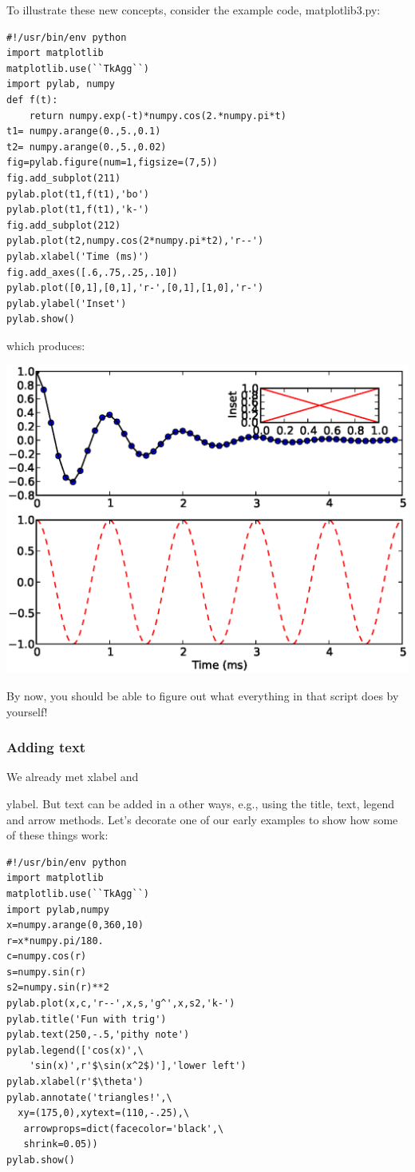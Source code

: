 \documentclass[11pt]{book}
\begin{document}
{{{To illustrate these new concepts, consider the example code, {\color{blue}matplotlib3.py}:

{ \color{blue} \begin{verbatim}
#!/usr/bin/env python
import matplotlib
matplotlib.use(``TkAgg``)
import pylab, numpy
def f(t):
    return numpy.exp(-t)*numpy.cos(2.*numpy.pi*t)
t1= numpy.arange(0.,5.,0.1)
t2= numpy.arange(0.,5.,0.02)
fig=pylab.figure(num=1,figsize=(7,5))
fig.add_subplot(211)
pylab.plot(t1,f(t1),'bo')
pylab.plot(t1,f(t1),'k-')
fig.add_subplot(212)
pylab.plot(t2,numpy.cos(2*numpy.pi*t2),'r--')
pylab.xlabel('Time (ms)')
fig.add_axes([.6,.75,.25,.10])
pylab.plot([0,1],[0,1],'r-',[0,1],[1,0],'r-')
pylab.ylabel('Inset')
pylab.show()
\end{verbatim}}

\noindent which produces:

{\includegraphics[width=15cm]{EPSfiles/matplotlib3.eps}}

\noindent By now, you should be able to figure out what everything in that script does by yourself!

\subsubsection{Adding text}

We already met {\color{blue}xlabel} and {{\color{blue}ylabel}.  But text can be added in a other ways, e.g., using the  title, text, legend and arrow methods.
Let's decorate one of our early examples to show how some of these things work:

{ \color{blue} \begin{verbatim}
#!/usr/bin/env python
import matplotlib
matplotlib.use(``TkAgg``)
import pylab,numpy
x=numpy.arange(0,360,10)
r=x*numpy.pi/180.
c=numpy.cos(r)
s=numpy.sin(r)
s2=numpy.sin(r)**2
pylab.plot(x,c,'r--',x,s,'g^',x,s2,'k-')
pylab.title('Fun with trig')
pylab.text(250,-.5,'pithy note')
pylab.legend(['cos(x)',\
    'sin(x)',r'$\sin(x^2$)'],'lower left')
pylab.xlabel(r'$\theta')
pylab.annotate('triangles!',\
  xy=(175,0),xytext=(110,-.25),\
   arrowprops=dict(facecolor='black',\
   shrink=0.05))
pylab.show()
\end{verbatim}}

}}}}
\end{document}
